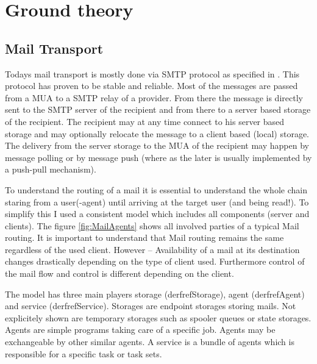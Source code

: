 \chapter{Ground theory}
\section{Mail Transport}\label{sec:mailTransport}
Todays mail transport is mostly done via SMTP protocol as specified in \cite{RFC5321}. This protocol has proven to be stable and reliable. Most of the messages are passed from a MUA to a SMTP relay of a provider. From there the message is directly sent to the SMTP server of the recipient and from there to a server based storage of the recipient. The recipient may at any time connect to his server based storage and may optionally relocate the message to a client based (local) storage. The delivery from the server storage to the MUA of the recipient may happen by message polling or by message push (where as the later is usually implemented by a push-pull mechanism).\par

To understand the routing of a mail it is essential to understand the whole chain staring from a user(-agent) until arriving at the target user (and being read!). To simplify this I used a consistent model which includes all components (server and clients). The figure \ref{fig:MailAgents} shows all involved parties of a typical Mail routing. It is important to understand that Mail routing remains the same regardless of the used client. However -- Availability of a mail at its destination changes drastically depending on the type of client used. Furthermore control of the mail flow and control is different depending on the client.\par

The model has three main players storage (derfref{Storage}), agent (derfref{Agent}) and service (derfref{Service}). Storages are endpoint storages storing mails. Not explicitely shown are temporary storages such as spooler queues or state storages. Agents are simple programs taking care of a specific job. Agents may be exchangeable by other similar agents. A service is a bundle of agents which is responsible for a specific task or task sets.

